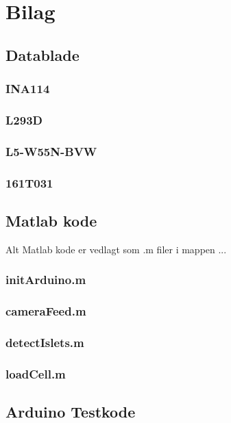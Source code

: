 \chapter{Bilag}
\section{Datablade}

\subsection{INA114}
\label{bilag:INA114}

\subsection{L293D}
\label{bilag:L293D}

\subsection{L5-W55N-BVW}
\label{bilag:L5-W55N-BVW}

\subsection{161T031}
\label{bilag:ventil}

\section{Matlab kode}
Alt Matlab kode er vedlagt som .m filer i mappen ... 
\subsection{initArduino.m} \label{bilag:initArduino}
\subsection{cameraFeed.m} \label{bilag:cameraFeed}
\subsection{detectIslets.m}
\subsection{loadCell.m}
\section{Arduino Testkode}

